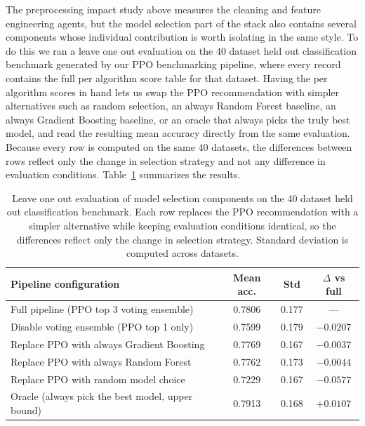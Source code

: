 \documentclass{article}
\begin{document}
The preprocessing impact study above measures the cleaning and feature
engineering agents, but the model selection part of the stack also contains
several components whose individual contribution is worth isolating in the
same style. To do this we ran a leave one out evaluation on the 40 dataset
held out classification benchmark generated by our PPO benchmarking pipeline,
where every record contains the full per algorithm score table for that
dataset. Having the per algorithm scores in hand lets us swap the PPO
recommendation with simpler alternatives such as random selection, an always
Random Forest baseline, an always Gradient Boosting baseline, or an oracle
that always picks the truly best model, and read the resulting mean accuracy
directly from the same evaluation. Because every row is computed on the same
40 datasets, the differences between rows reflect only the change in
selection strategy and not any difference in evaluation conditions.
Table~\ref{tab:stack_ablation} summarizes the results.

\begin{table}[h]
\centering
\caption{Leave one out evaluation of model selection components on the 40
dataset held out classification benchmark. Each row replaces the PPO
recommendation with a simpler alternative while keeping evaluation conditions
identical, so the differences reflect only the change in selection strategy.
Standard deviation is computed across datasets.}
\label{tab:stack_ablation}
\begin{tabular}{@{}lccc@{}}
\toprule
\textbf{Pipeline configuration} & \textbf{Mean acc.} & \textbf{Std} & \textbf{$\Delta$ vs full} \\
\midrule
Full pipeline (PPO top 3 voting ensemble)             & 0.7806 & 0.177 & --- \\
Disable voting ensemble (PPO top 1 only)              & 0.7599 & 0.179 & $-0.0207$ \\
Replace PPO with always Gradient Boosting             & 0.7769 & 0.167 & $-0.0037$ \\
Replace PPO with always Random Forest                 & 0.7762 & 0.173 & $-0.0044$ \\
Replace PPO with random model choice                  & 0.7229 & 0.167 & $-0.0577$ \\
Oracle (always pick the best model, upper bound)      & 0.7913 & 0.168 & $+0.0107$ \\
\bottomrule
\end{tabular}
\end{table}
\end{document}
